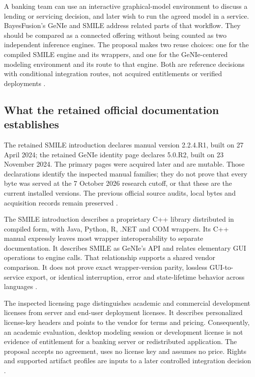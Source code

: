 A banking team can use an interactive graphical-model environment to discuss
a lending or servicing decision, and later wish to run the agreed model in
a service. BayesFusion's GeNIe and SMILE address related parts of that
workflow. They should be compared as a connected offering without being
counted as two independent inference engines. The proposal makes two reuse
choices: one for the compiled SMILE engine and its wrappers, and one for the
GeNIe-centered modeling environment and its route to that engine. Both are
reference decisions with conditional integration routes, not acquired
entitlements or verified deployments \cite{exec13_smile_intro,
exec13_smile_license,exec24_smile_choice}.

\subsection{What the retained official documentation establishes}
The retained SMILE introduction declares manual version 2.2.4.R1, built on
27 April 2024; the retained GeNIe identity page declares 5.0.R2, built on
23 November 2024. The primary pages were acquired later and are mutable.
Those declarations identify the inspected manual families; they do not
prove that every byte was served at the 7 October 2026 research cutoff,
or that these are the current installed versions. The previous official
source audits, local bytes and acquisition records remain preserved
\cite{exec13_smile_intro,exec13_genie_readme,exec24_smile_choice}.

The SMILE introduction describes a proprietary C++ library distributed in
compiled form, with Java, Python, R, .NET and COM wrappers. Its C++ manual
expressly leaves most wrapper interoperability to separate documentation.
It describes SMILE as GeNIe's API and relates elementary GUI operations to
engine calls. That relationship supports a shared vendor comparison. It
does not prove exact wrapper-version parity, lossless GUI-to-service export,
or identical interruption, error and state-lifetime behavior across languages
\cite{exec13_smile_intro}.

The inspected licensing page distinguishes academic and commercial
development licenses from server and end-user deployment licenses. It
describes personalized license-key headers and points to the vendor for
terms and pricing. Consequently, an academic evaluation, desktop modeling
session or development license is not evidence of entitlement for a banking
server or redistributed application. The proposal accepts no agreement,
uses no license key and assumes no price. Rights and supported artifact
profiles are inputs to a later controlled integration decision
\cite{exec13_smile_license,exec24_smile_choice}.


